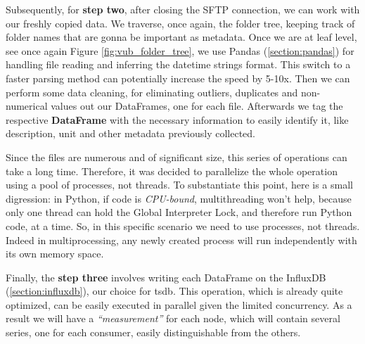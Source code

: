Subsequently, for \textbf{step two}, after closing the \ac{SFTP} connection, we can work with our freshly copied data. We traverse, once again, the folder tree, keeping track of
folder names that are gonna be important as metadata. Once we are at leaf level, see once again Figure \ref{fig:vub_folder_tree}, we use 
Pandas (\ref{section:pandas}) for handling file reading and inferring the datetime strings format. This switch to a faster parsing method can potentially increase the speed by 5-10x. %
Then we can perform some data cleaning, for eliminating outliers, duplicates and non-numerical values out our DataFrames, one for each file.
Afterwards we tag the respective \textbf{DataFrame} with the necessary information to easily identify it, like description, unit and other metadata previously collected.

Since the files are numerous and of significant size, this series of operations can take a long time. 
Therefore, it was decided to parallelize the whole operation using a pool of processes, not threads. To substantiate this point, here is a small digression: 
in Python, if code is \textit{CPU-bound}, multithreading won't help, because only one thread can hold the Global Interpreter Lock, and therefore run Python code, at a time. 
So, in this specific scenario we need to use processes, not threads. Indeed in multiprocessing, any newly created process will run independently with its own memory space.

Finally, the \textbf{step three} involves writing each DataFrame on the InfluxDB (\ref*{section:influxdb}), our choice for \acl{tsdb}.
This operation, which is already quite optimized, can be easily executed in parallel given the limited concurrency.
As a result we will have a \textit{``measurement''} for each node, which will contain several series, one for each consumer, easily distinguishable from the others.

